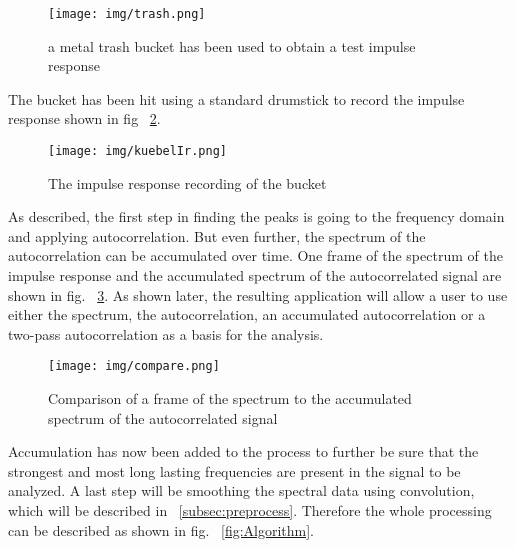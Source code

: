 \begin{figure}[h]
	\begin{center}
		\texttt{[image: img/trash.png]}
		\caption{a metal trash bucket has been used to obtain a test impulse response}
		\label{trash}
	\end{center}
\end{figure}

The bucket has been hit using a standard drumstick to record the impulse response shown in fig ~\ref{kuebelIr}.

\begin{figure}[h]
	\begin{center}
		\texttt{[image: img/kuebelIr.png]}
		\caption{The impulse response recording of the bucket}
		\label{kuebelIr}
	\end{center}
\end{figure}

As described, the first step in finding the peaks is going to the frequency domain and applying autocorrelation. But even further, the spectrum of the autocorrelation can be accumulated over time. One frame of the spectrum of the impulse response and the accumulated spectrum of the autocorrelated signal are shown in fig. ~\ref{compare}. As shown later, the resulting application will allow a user to use either the spectrum, the autocorrelation, an accumulated autocorrelation or a two-pass autocorrelation as a basis for the analysis.



\begin{figure}[h]
	\begin{center}
		\texttt{[image: img/compare.png]}
		\caption{Comparison of a frame of the spectrum to the accumulated spectrum of the autocorrelated signal}
		\label{compare}
	\end{center}	
\end{figure}





Accumulation has now been added to the process to further be sure that the strongest and most long lasting frequencies are present in the signal to be analyzed. A last step will be smoothing the spectral data using convolution, which will be described in ~\ref{subsec:preprocess}. Therefore the whole processing can be described as shown in fig. ~\ref{fig:Algorithm}. 

